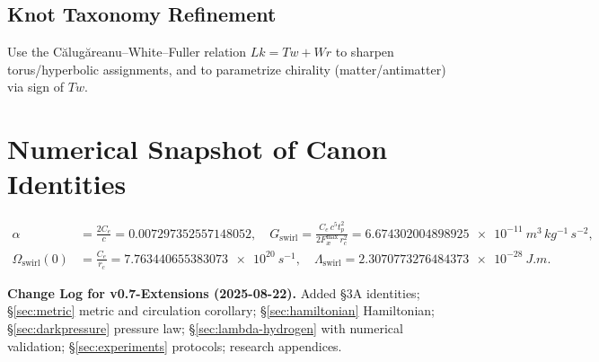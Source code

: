 \documentclass[11pt]{article}
\newcommand{\Ce}{C_e}
\newcommand{\rc}{r_c}
\newcommand{\tp}{t_p}
\newcommand{\aeforce}{F_{\text{\ae}}^{\max}}
\newcommand{\Om}{\Omega_{\text{swirl}}}
\newcommand{\Lam}{\Lambda_{\text{swirl}}}
\begin{document}
\subsection{Knot Taxonomy Refinement}
Use the Călugăreanu–White–Fuller relation \(Lk=Tw+Wr\) \cite{Calugareanu1961,White1969} to sharpen torus/hyperbolic assignments, and to parametrize chirality (matter/antimatter) via sign of \(Tw\).

\section*{Numerical Snapshot of Canon Identities}
\begin{align}
  \alpha &= \frac{2\Ce}{c} = \num{0.007297352557148052},\quad
  G_{\text{swirl}} = \frac{\Ce\,c^5 \tp^2}{2\aeforce\,\rc^2} = \num{6.674302004898925e-11}\ \si{m^3\,kg^{-1}\,s^{-2}},\\
  \Om(0) &= \frac{\Ce}{\rc} = \num{7.763440655383073e20}\ \si{s^{-1}},\quad
  \Lam = \num{2.3070773276484373e-28}\ \si{J.m}.
\end{align}

\vspace{1em}
\noindent\textbf{Change Log for v0.7-Extensions (2025-08-22).} Added \S3A identities; \S\ref{sec:metric} metric and circulation corollary; \S\ref{sec:hamiltonian} Hamiltonian; \S\ref{sec:darkpressure} pressure law; \S\ref{sec:lambda-hydrogen} with numerical validation; \S\ref{sec:experiments} protocols; research appendices.



\end{document}
